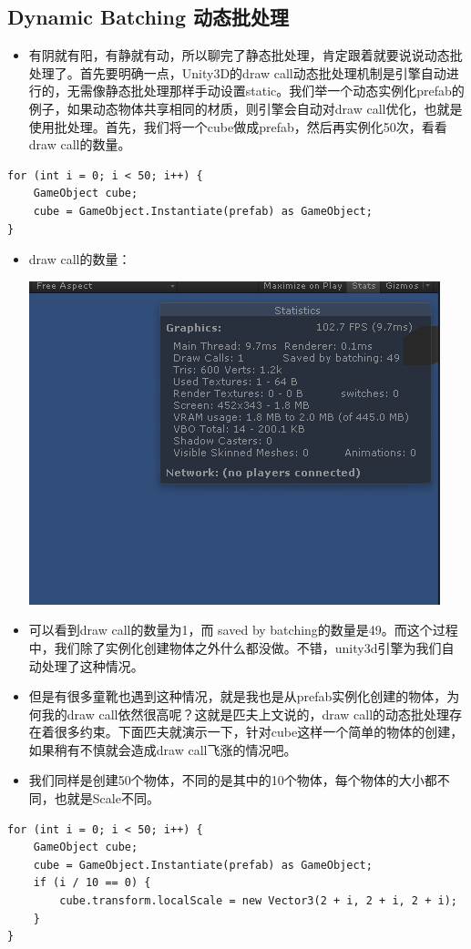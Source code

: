\documentclass[9pt, b5paper]{article}
\begin{document}
\subsection{Dynamic Batching 动态批处理}
\label{sec:org806bd41}
\begin{itemize}
\item 有阴就有阳，有静就有动，所以聊完了静态批处理，肯定跟着就要说说动态批处理了。首先要明确一点，Unity3D的draw call动态批处理机制是引擎自动进行的，无需像静态批处理那样手动设置static。我们举一个动态实例化prefab的例子，如果动态物体共享相同的材质，则引擎会自动对draw call优化，也就是使用批处理。首先，我们将一个cube做成prefab，然后再实例化50次，看看draw call的数量。
\end{itemize}
\begin{verbatim}
for (int i = 0; i < 50; i++) {
    GameObject cube;
    cube = GameObject.Instantiate(prefab) as GameObject;
}
\end{verbatim}
\begin{itemize}
\item draw call的数量：

\begin{center}
\includegraphics[width=.9\linewidth]{./pic/drawcall.png}
\end{center}
\item 可以看到draw call的数量为1，而 saved by batching的数量是49。而这个过程中，我们除了实例化创建物体之外什么都没做。不错，unity3d引擎为我们自动处理了这种情况。
\item 但是有很多童靴也遇到这种情况，就是我也是从prefab实例化创建的物体，为何我的draw call依然很高呢？这就是匹夫上文说的，draw call的动态批处理存在着很多约束。下面匹夫就演示一下，针对cube这样一个简单的物体的创建，如果稍有不慎就会造成draw call飞涨的情况吧。
\item 我们同样是创建50个物体，不同的是其中的10个物体，每个物体的大小都不同，也就是Scale不同。
\end{itemize}
\begin{verbatim}
for (int i = 0; i < 50; i++) {
    GameObject cube;
    cube = GameObject.Instantiate(prefab) as GameObject;
    if (i / 10 == 0) {
        cube.transform.localScale = new Vector3(2 + i, 2 + i, 2 + i);
    }
}
\end{verbatim}
\end{document}
